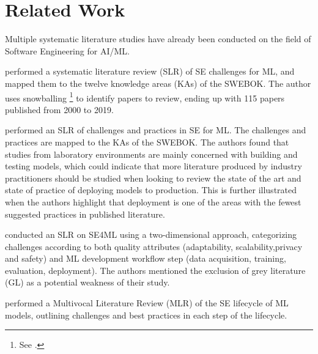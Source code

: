 \chapter{Related Work}
\label{ch:related_work}
Multiple systematic literature studies have already been conducted on the field of Software Engineering for AI/ML.


\textcite{Kumeno2020} performed a systematic literature review (SLR) of SE challenges for ML, and mapped them to the twelve knowledge areas (KAs) of the SWEBOK.
The author uses snowballing \footnote{See \textcite{Wohlin2014}.} to identify papers to review, ending up with 115 papers published from 2000 to 2019.

\textcite{Nascimento2020} performed an SLR of challenges and practices in SE for ML. The challenges and practices are mapped to the KAs of the SWEBOK.
The authors found that studies from laboratory environments are mainly concerned with building and testing models, which could indicate that more literature produced by industry practitioners should be studied when looking to review the state of the art and state of practice of deploying models to production.
This is further illustrated when the authors highlight that deployment is one of the areas with the fewest suggested practices in published literature.

\textcite{Lwakatare2020} conducted an SLR on SE4ML using a two-dimensional approach, categorizing  challenges according to both  quality  attributes  (adaptability, scalability,privacy and safety) and ML development workflow step (data acquisition, training, evaluation, deployment).
The authors mentioned the exclusion of grey  literature (GL) as a potential weakness of their study.

\textcite{John2021} performed a Multivocal Literature Review (MLR) of the SE lifecycle of ML models, outlining challenges and best practices in each step of the lifecycle.

